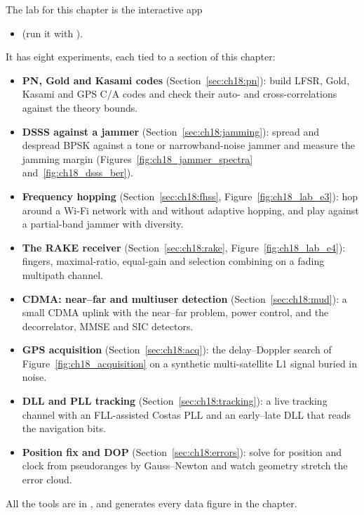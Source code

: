 \begin{labbox}
The lab for this chapter is the interactive app
\begin{itemize}
\item {} (run it with
).
\end{itemize}
It has eight experiments, each tied to a section of this chapter:
\begin{itemize}
\item \textbf{PN, Gold and Kasami codes} (Section~\ref{sec:ch18:pn}): build LFSR, Gold, Kasami and
GPS C/A codes and check their auto- and cross-correlations against the theory bounds.
\item \textbf{DSSS against a jammer} (Section~\ref{sec:ch18:jamming}): spread and despread BPSK
against a tone or narrowband-noise jammer and measure the jamming margin
(Figures~\ref{fig:ch18_jammer_spectra} and~\ref{fig:ch18_dsss_ber}).
\item \textbf{Frequency hopping} (Section~\ref{sec:ch18:fhss}, Figure~\ref{fig:ch18_lab_e3}): hop
around a Wi-Fi network with and without adaptive hopping, and play against a partial-band jammer
with diversity.
\item \textbf{The RAKE receiver} (Section~\ref{sec:ch18:rake}, Figure~\ref{fig:ch18_lab_e4}): fingers, maximal-ratio, equal-gain
and selection combining on a fading multipath channel.
\item \textbf{CDMA: near--far and multiuser detection} (Section~\ref{sec:ch18:mud}): a small CDMA
uplink with the near--far problem, power control, and the decorrelator, MMSE and SIC detectors.
\item \textbf{GPS acquisition} (Section~\ref{sec:ch18:acq}): the delay--Doppler search of
Figure~\ref{fig:ch18_acquisition} on a synthetic multi-satellite L1 signal buried in noise.
\item \textbf{DLL and PLL tracking} (Section~\ref{sec:ch18:tracking}): a live tracking channel with
an FLL-assisted Costas PLL and an early--late DLL that reads the navigation bits.
\item \textbf{Position fix and DOP} (Section~\ref{sec:ch18:errors}): solve for position and clock
from pseudoranges by Gauss--Newton and watch geometry stretch the error cloud.
\end{itemize}
All the tools are in , and 
generates every data figure in the chapter.
\end{labbox}

